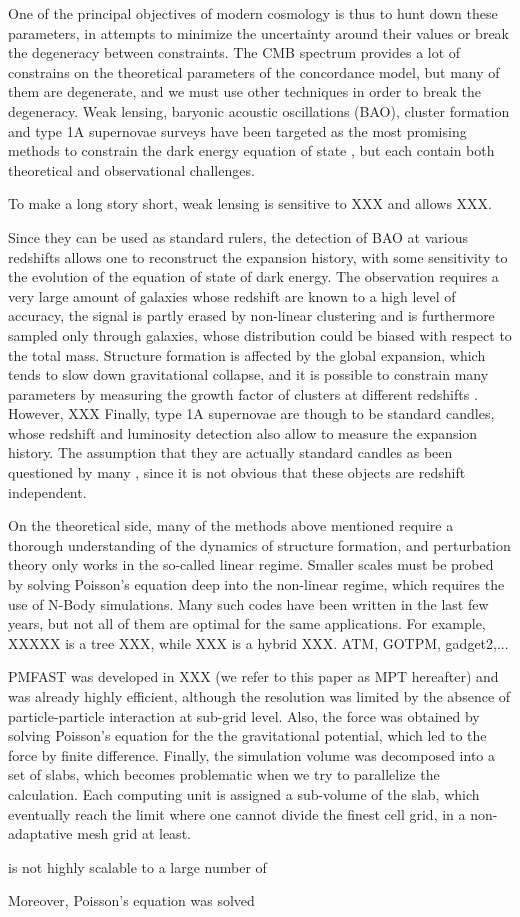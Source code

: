 One of the principal objectives of modern cosmology is thus to hunt down these parameters, in attempts to minimize the uncertainty around their values or break the degeneracy between constraints.
The CMB spectrum provides a lot of constrains on the theoretical parameters of the concordance model, but many of them are degenerate, and we must use other techniques in order to break the degeneracy. 
Weak lensing, baryonic acoustic oscillations (BAO), cluster formation and type 1A supernovae surveys
have been targeted as the most promising methods to constrain the dark energy equation of state \cite{ref:DETF}, but each contain
both theoretical and observational challenges.

To make a long story short, weak lensing is sensitive to XXX and allows XXX.

Since they can be used as standard rulers, the detection of BAO at various redshifts allows one to reconstruct the expansion history,
with some sensitivity to the evolution of the equation of state of dark energy. The observation requires a very large amount of galaxies whose
redshift are known to a high level of accuracy, the signal is partly erased by non-linear clustering and is furthermore sampled only through galaxies,
whose distribution could be biased with respect to the total mass. 
Structure formation is affected by the global expansion, which tends to slow down gravitational collapse, and it is possible to constrain
many parameters by measuring the growth factor of clusters at different redshifts \cite{ref:growth}. However, XXX
Finally, type 1A supernovae are though to be standard candles, whose redshift and luminosity detection also allow to measure the expansion history.
The assumption that they are actually standard candles as been questioned by many \cite{ref:SNdoubt}, since it is not obvious that these objects are redshift independent.


On the theoretical side, many of the methods above mentioned require a thorough understanding of the dynamics of structure formation, and
perturbation theory only works in the so-called linear regime. Smaller scales must be probed by solving Poisson's equation deep into the non-linear regime,
which requires the use of N-Body simulations. Many such codes have been written in the last few years, but not all of them are optimal for the same applications.
For example, XXXXX is a tree XXX, while XXX is a hybrid XXX. ATM, GOTPM, gadget2,...

PMFAST was developed in XXX \cite{ref:PMFAST} (we refer to this paper as MPT hereafter) and was already highly efficient, although the resolution was limited by the absence of particle-particle interaction at sub-grid level. Also, the force was obtained by solving Poisson's equation for the the gravitational potential, which led to the force by finite difference. 
Finally, the simulation volume was decomposed into a set of slabs, which becomes problematic when we try to parallelize the calculation.
Each computing unit is assigned a sub-volume of the slab, which eventually reach the limit where one cannot divide the finest cell grid, in a non-adaptative mesh grid at least.

is not highly scalable to a large number of 


Moreover, Poisson's equation was solved 
